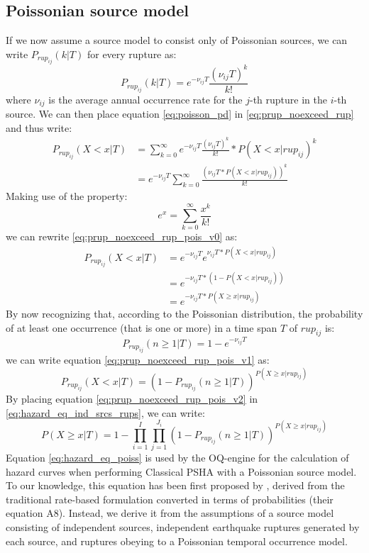 \subsection{Poissonian source model}
If we now assume a source model to consist only of Poissonian sources, we can write $P_{rup_{ij}}(k | T)$ for every rupture as:
\begin{equation}
\label{eq:poisson_pd}
P_{rup_{ij}}(k | T) = e^{-\nu_{ij} T} \frac{(\nu_{ij} T) ^ {k}}{k!}
\end{equation}
where $\nu_{ij}$ is the average annual occurrence rate for the $j$-th rupture in the $i$-th source. We can then place equation \ref{eq:poisson_pd} in \ref{eq:prup_noexceed_rup} and thus write:
\begin{align}
\label{eq:prup_noexceed_rup_pois_v0}
P_{rup_{ij}}(X < x | T) & = \sum_{k=0}^{\infty} e^{-\nu_{ij} T} \frac{(\nu_{ij} T) ^ {k}}{k!} * P(X < x | rup_{ij}) ^ {k} \nonumber \\
				 & =  e^{-\nu_{ij} T} \sum_{k=0}^{\infty} \frac{(\nu_{ij} T * P(X < x | rup_{ij})) ^ {k}}{k!}
\end{align}
Making use of the property:
\begin{equation}
e^{x} = \sum_{k=0} ^ {\infty} \frac{x^{k}}{k!}
\end{equation}
we can rewrite \ref{eq:prup_noexceed_rup_pois_v0} as:
\begin{align}
\label{eq:prup_noexceed_rup_pois_v1}
P_{rup_{ij}}(X < x | T) & = e^{-\nu_{ij} T} e ^ {\nu_{ij} T * P(X < x | rup_{ij})} \nonumber \\
				 & = e^{-\nu_{ij} T * (1 - P(X < x | rup_{ij}))} \nonumber \\
				 & = e^{-\nu_{ij} T * P(X \ge x | rup_{ij})}
\end{align}
By now recognizing that, according to the Poissonian distribution, the
probability of at least one occurrence (that is one or more) in a time span $T$
of $rup_{ij}$ is:
\begin{equation}
P_{rup_{ij}}(n \ge 1 | T) = 1 -  e^{-\nu_{ij} T}
\end{equation}
we can write equation \ref{eq:prup_noexceed_rup_pois_v1} as:
\begin{equation}
\label{eq:prup_noexceed_rup_pois_v2}
P_{rup_{ij}}(X < x | T) = (1 - P_{rup_{ij}}(n \ge 1 | T))^{P(X \ge x | rup_{ij})}
\end{equation}
By placing equation \ref{eq:prup_noexceed_rup_pois_v2} in \ref{eq:hazard_eq_ind_srcs_rups}, we can
write:
\begin{equation}
\label{eq:hazard_eq_poiss}
P(X \ge x | T) =  1 - \prod_{i=1}^{I} \prod_{j=1}^{J_{i}} (1 - P_{rup_{ij}}(n \ge 1 | T))^{P(X \ge x | rup_{ij})}
\end{equation}
Equation \ref{eq:hazard_eq_poiss} is used by the OQ-engine for the calculation of hazard curves when performing
Classical PSHA with a Poissonian source model. To our knowledge, this equation has been first proposed by \citet{field2003},
derived from the traditional rate-based formulation converted in terms of probabilities (their equation A8).
Instead, we derive it from the assumptions of a source model consisting of independent sources, independent
earthquake ruptures generated by each source, and ruptures obeying to a Poissonian temporal occurrence model.

